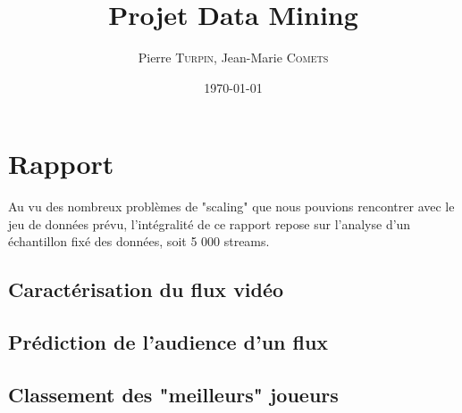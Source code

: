 \documentclass[11pt, a4paper, titlepage]{scrartcl}
\title{Projet Data Mining}
\author{Pierre \textsc{Turpin}, Jean-Marie \textsc{Comets}}
\date{\today}
\begin{document}
\maketitle
\tableofcontents
\newpage

% 
% 

\section{Rapport}

Au vu des nombreux problèmes de "scaling" que nous pouvions rencontrer
avec le jeu de données prévu, l'intégralité de ce rapport repose sur
l'analyse d'un échantillon fixé des données, soit 5 000 streams.

\subsection{Caractérisation du flux vidéo}



\subsection{Prédiction de l'audience d'un flux}


\subsection{Classement des "meilleurs" joueurs}

\end{document}
